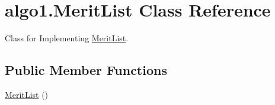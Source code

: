 \hypertarget{classalgo1_1_1MeritList}{\section{algo1.\+Merit\+List Class Reference}
\label{classalgo1_1_1MeritList}
}


Class for Implementing \hyperlink{classalgo1_1_1MeritList}{Merit\+List}.  


\subsection*{Public Member Functions}
\begin{DoxyCompactItemize}
\item 
\hypertarget{classalgo1_1_1MeritList_af90d9dd2fb5276e48e6029e8a776f302}{\hyperlink{classalgo1_1_1MeritList_af90d9dd2fb5276e48e6029e8a776f302}{Merit\+List} ()}\label{classalgo1_1_1MeritList_af90d9dd2fb5276e48e6029e8a776f302}


\end{DoxyCompactItemize}
